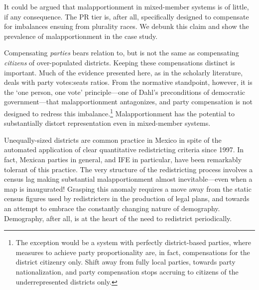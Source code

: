 \documentclass[letter,12pt]{article}
\begin{document}
It could be argued that malapportionment in mixed-member systems is of little, if any consequence. The PR tier is, after all, specifically designed to compensate for imbalances ensuing from plurality races. We debunk this claim and show the prevalence of malapportionment in the case study. 

Compensating \emph{parties} bears relation to, but is not the same as compensating \emph{citizens} of over-populated districts. Keeping these compensations distinct is important. Much of the evidence presented here, as in the scholarly literature, deals with party votes:seats ratios. From the normative standpoint, however, it is the `one person, one vote' principle---one of Dahl's \citeyearpar{dahl.1972} preconditions of democratic government---that malapportionment antagonizes, and party compensation is not designed to redress this imbalance.\footnote{The exception would be a system with perfectly district-based parties, where measures to achieve party proportionality are, in fact, compensations for the district citizenry only. Shift away from fully local parties, towards party nationalization, and party compensation stops accruing to citizens of the underrepresented districts only.} Malapportionment has the potential to substantially distort representation even in mixed-member systems. 

Unequally-sized districts are common practice in Mexico in spite of the automated application of clear quantitative redistricting criteria since 1997. In fact, Mexican parties in general, and IFE in particular, have been remarkably tolerant of this practice. The very structure of the redistricting process involves a census lag making substantial malapportionment almost inevitable---even when a map is inaugurated! Grasping this anomaly requires a move away from the static census figures used by redistricters in the production of legal plans, and towards an attempt to embrace the constantly changing nature of demography. Demography, after all, is at the heart of the need to redistrict periodically.
\end{document}
